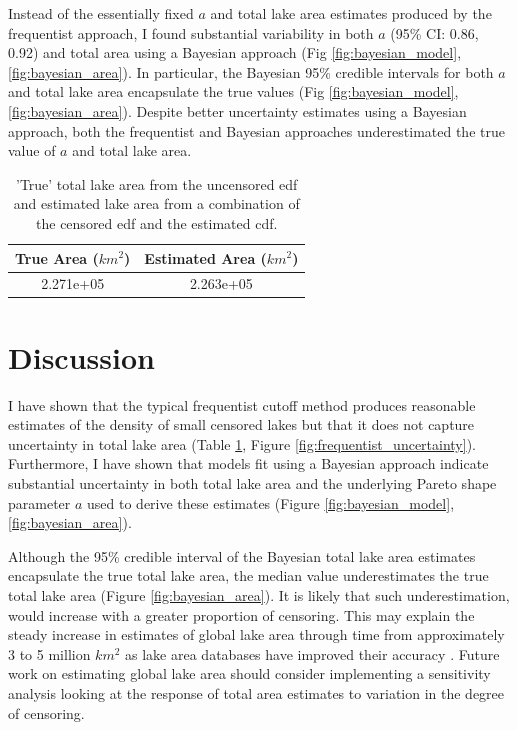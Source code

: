 \documentclass{article}
\begin{document}
Instead of the essentially fixed $a$ and total lake area estimates produced by the frequentist approach, I found substantial variability in both $a$ (95\% CI: 0.86, 0.92) and total area using a Bayesian approach (Fig \ref{fig:bayesian_model}, \ref{fig:bayesian_area}). In particular, the Bayesian 95\% credible intervals for both $a$ and total lake area encapsulate the true values (Fig \ref{fig:bayesian_model}, \ref{fig:bayesian_area}). Despite better uncertainty estimates using a Bayesian approach, both the frequentist and Bayesian approaches underestimated the true value of $a$ and total lake area.

\begin{table}
	\caption{'True' total lake area from the uncensored edf and estimated lake area from a combination of the censored edf and the estimated cdf.}
	\centering
	\begin{tabular}{cc}
		\toprule
		True Area ($km^2$) & Estimated Area ($km^2$) \\
		\midrule
		2.271e+05          & 2.263e+05               \\
		\bottomrule
	\end{tabular}
	\label{tab:pred_table}
\end{table}

\section{Discussion}

I have shown that the typical frequentist cutoff method produces reasonable estimates of the density of small censored lakes but that it does not capture uncertainty in total lake area (Table \ref{tab:pred_table}, Figure \ref{fig:frequentist_uncertainty}). Furthermore, I have shown that models fit using a Bayesian approach indicate substantial uncertainty in both total lake area and the underlying Pareto shape parameter $a$ used to derive these estimates (Figure \ref{fig:bayesian_model}, \ref{fig:bayesian_area}).

Although the 95\% credible interval of the Bayesian total lake area estimates encapsulate the true total lake area, the median value underestimates the true total lake area (Figure \ref{fig:bayesian_area}). It is likely that such underestimation, would increase with a greater proportion of censoring. This may explain the steady increase in estimates of global lake area through time from approximately 3 to 5 million $km^{2}$ as lake area databases have improved their accuracy \citep{lehnerDevelopmentValidationGlobal2004, downingGlobalAbundanceSize2006, verpoorterGlobalInventoryLakes2014}. Future work on estimating global lake area should consider implementing a sensitivity analysis looking at the response of total area estimates to variation in the degree of censoring.
\end{document}
